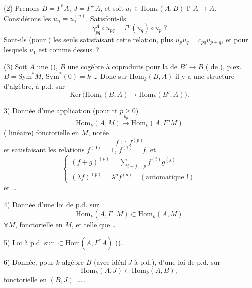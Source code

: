 \documentclass[11pt,a4paper]{article}
\begin{document}
(2) Prenons $B = \Gamma^*A$, $J = \Gamma^+A$, et soit $u_1 \in \mathrm{Hom}_k(A,B)$ l' $A\to A$. Considérons les $u_n = u_1^{(n)}$. Satisfont-ils
\[
\gamma^A_{pq}\circ u_{pq} = \Gamma^p(u_q)\circ u_p \;?
\]
Sont-ils (pour ) les seuls  satisfaisant cette relation, plus $u_pu_q = c_{pq}u_{p+q}$, et pour lesquels $u_1$ est comme dessus~?

(3) Soit $A$ une   (), $B$ une cogèbre à coproduits  pour la  de $B'\to B$ ( de ), p.ex. $B = \mathrm{Sym}^*M$,  $\mathrm{Sym}^*(0) = k$ … Donc sur $\mathrm{Hom}_k(B,A)$ il y a une structure  d'algèbre, à p.d. sur
\[
\mathrm{Ker}\,\bigl(\mathrm{Hom}_k(B,A)\to\mathrm{Hom}_k(B',A)\bigr).
\]

3) Donnée d'une application (pour tt $p\ge0$)
\[
\mathrm{Hom}_k(A,M) \xrightarrow{u_p} \mathrm{Hom}_k(A,\Gamma^pM)
\]
( linéaire) fonctorielle en $M$, notée   \ill{}
\[
f \longmapsto f^{(p)}
\]
et satisfaisant les relations $f^{(0)} = 1$, $f^{(1)} = f$, et
\[
\begin{cases}
(f+g)^{(p)} = \sum_{i+j=p} f^{(i)}g^{(j)} \\
(\lambda f)^{(p)} = \lambda^p f^{(p)} \quad (\text{automatique~!})
\end{cases}
\]
et …

4) Donnée d'une loi de p.d. sur
\[
\mathrm{Hom}_k(A,\Gamma^+M) \subset \mathrm{Hom}_k(A,M)
\]
$\forall M$, fonctorielle en $M$, et telle que …

5) Loi à p.d. sur   $\subset \mathrm{Hom}(A,\Gamma^*A)$ ().

6) Donnée, pour  $k$-algèbre $B$ (avec idéal $J$ à p.d.), d'une loi de p.d. sur
\[
\mathrm{Hom}_k(A,J) \subset \mathrm{Hom}_k(A,B),
\]
fonctorielle en $(B,J)$ ……

\end{document}
